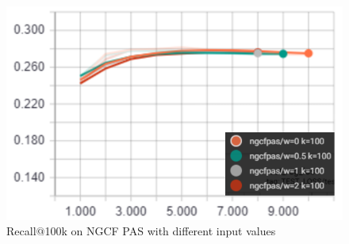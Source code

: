 \begin{figure}
    \includegraphics[width=\linewidth]{figures/graphs/recall-ngcfpas-weights.png}
    \caption{Recall$@$100k on NGCF PAS with different input values}
    \label{fig:recall-ngcfpas-weights}
\end{figure}

